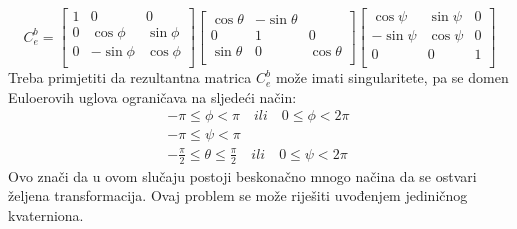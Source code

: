 \begin{equation}    
    C_e^b=\begin{bmatrix}
        1&0&0\\
        0&\cos\phi & \sin\phi \\
        0 & -\sin\phi & \cos\phi \\
    \end{bmatrix}    
    \begin{bmatrix}
        \cos\theta&-\sin\theta&\\
        0&1 & 0 \\
        \sin\theta & 0 & \cos\theta \\
    \end{bmatrix}
    \begin{bmatrix}
        \cos\psi & \sin\psi & 0\\
        -\sin\psi & \cos\psi &0\\
        0&0&1\\
    \end{bmatrix}
\end{equation}
Treba primjetiti da rezultantna matrica $C_e^b$ može imati singularitete, pa se domen
Euloerovih uglova ograničava na sljedeći način:
\begin{align*}
    -\pi \leq \phi <\pi \quad ili \quad 0\leq\phi<2\pi \\
    -\pi \leq \psi <\pi \qquad \qquad \qquad \qquad \\
    -\frac{\pi}{2}\leq \theta \leq \frac{\pi}{2} \quad ili \quad 0\leq\psi<2\pi
\end{align*}
Ovo znači da u ovom slučaju postoji beskonačno mnogo načina da se ostvari željena transformacija.
Ovaj problem se može riješiti uvođenjem jediničnog kvaterniona.

